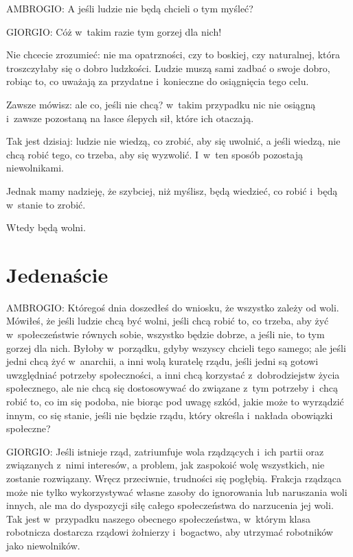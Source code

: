 \documentclass[oneside,polish,11pt,sfheadings]{mwbk}
\begin{document}
 
\noindent AMBROGIO: A jeśli ludzie nie będą chcieli o tym myśleć? 




 
\noindent GIORGIO: Cóż w~takim razie tym gorzej dla nich! 

 
Nie chcecie zrozumieć: nie ma opatrzności, czy to boskiej, czy naturalnej, która troszczyłaby się o dobro ludzkości.
Ludzie muszą sami zadbać o swoje dobro, robiąc to, co uważają za przydatne i~konieczne do osiągnięcia tego celu. 

 
Zawsze mówisz: ale co, jeśli nie chcą? w~takim przypadku nic nie osiągną i~zawsze pozostaną na łasce ślepych sił, które
ich otaczają. 

 
Tak jest dzisiaj: ludzie nie wiedzą, co zrobić, aby się uwolnić, a jeśli wiedzą, nie chcą robić tego, co trzeba, aby się
wyzwolić. I~w~ten sposób pozostają niewolnikami. 

 
Jednak mamy nadzieję, że szybciej, niż myślisz, będą wiedzieć, co robić i~będą w~stanie to zrobić. 

 
Wtedy będą wolni. 










\chapter*{Jedenaście}



 
\noindent AMBROGIO: Któregoś dnia doszedłeś do wniosku, że wszystko zależy od woli. Mówiłeś, że jeśli ludzie chcą być wolni, jeśli
chcą robić to, co trzeba, aby żyć w~społeczeństwie równych sobie, wszystko będzie dobrze, a jeśli nie, to tym gorzej
dla nich. Byłoby w~porządku, gdyby wszyscy chcieli tego samego; ale jeśli jedni chcą żyć w~anarchii, a inni wolą
kuratelę rządu, jeśli jedni są gotowi uwzględniać potrzeby społeczności, a inni chcą korzystać z~dobrodziejstw życia
społecznego, ale nie chcą się dostosowywać do związane z~tym potrzeby i~chcą robić to, co im się podoba, nie biorąc pod
uwagę szkód, jakie może to wyrządzić innym, co się stanie, jeśli nie będzie rządu, który określa i~nakłada obowiązki
społeczne? 




 
\noindent GIORGIO: Jeśli istnieje rząd, zatriumfuje wola rządzących i~ich partii oraz związanych z~nimi interesów, a problem, jak
zaspokoić wolę wszystkich, nie zostanie rozwiązany. Wręcz przeciwnie, trudności się pogłębią. Frakcja rządząca może nie
tylko wykorzystywać własne zasoby do ignorowania lub naruszania woli innych, ale ma do dyspozycji siłę całego
społeczeństwa do narzucenia jej woli. Tak jest w~przypadku naszego obecnego społeczeństwa, w~którym klasa robotnicza
dostarcza rządowi żołnierzy i~bogactwo, aby utrzymać robotników jako niewolników. 
\end{document}
